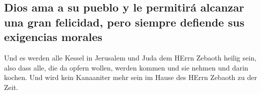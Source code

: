 \hypertarget{dios-ama-a-su-pueblo-y-le-permitiruxe1-alcanzar-una-gran-felicidad-pero-siempre-defiende-sus-exigencias-morales}{%
\subsection{Dios ama a su pueblo y le permitirá alcanzar una gran
felicidad, pero siempre defiende sus exigencias
morales}\label{dios-ama-a-su-pueblo-y-le-permitiruxe1-alcanzar-una-gran-felicidad-pero-siempre-defiende-sus-exigencias-morales}}

 Und es werden alle Kessel in Jerusalem und Juda dem
HErrn Zebaoth heilig sein, also dass alle, die da opfern wollen, werden
kommen und sie nehmen und darin kochen. Und wird kein Kanaaniter mehr
sein im Hause des HErrn Zebaoth zu der Zeit.
